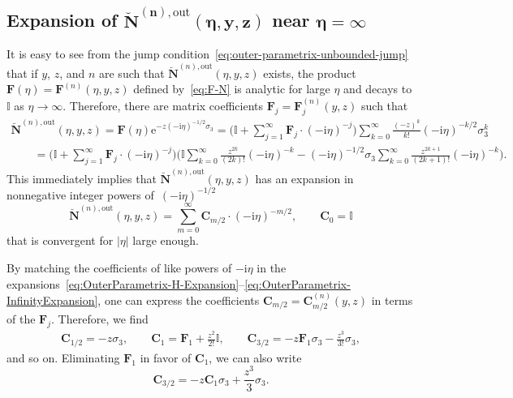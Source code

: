 \documentclass[11pt]{article}
\numberwithin{equation}{section}
\numberwithin{equation}{section}
\begin{document}
\subsection[Expansion of breve\{N\}\^{}\{(n),out\}(eta,y,z) near eta = infty]{Expansion of $\boldsymbol{\breve{\mathbf{N}}^{(n),\mathrm{out}}(\eta,y,z)}$ near $\boldsymbol{\eta=\infty}$}

It is easy to see from the jump condition~\eqref{eq:outer-parametrix-unbounded-jump} that if $y$, $z$, and $n$ are such that $\breve{\mathbf{N}}^{(n),\mathrm{out}}(\eta,y,z)$ exists, the product $\mathbf{F}(\eta)=\mathbf{F}^{(n)}(\eta,y,z)$ defined by~\eqref{eq:F-N} is analytic for large $\eta$ and decays to $\mathbb{I}$ as $\eta\to\infty$. Therefore, there are matrix coefficients $\mathbf{F}_j=\mathbf{F}_j^{(n)}(y,z)$ such that
\begin{gather}
\breve{\mathbf{N}}^{(n),\mathrm{out}}(\eta,y,z)=\mathbf{F}(\eta)\mathrm{e}^{-z(-\mathrm{i}\eta)^{-1/2}\sigma_3}
 =\Bigg(\!\mathbb{I} + \sum_{j=1}^\infty\mathbf{F}_j\cdot(-\mathrm{i}\eta)^{-j}\!\Bigg)\sum_{k=0}^\infty\frac{(-z)^k}{k!}(-\mathrm{i}\eta)^{-k/2}\sigma_3^k \!\!\!\label{eq:OuterParametrix-H-Expansion}\\
\qquad=\Bigg(\mathbb{I} + \sum_{j=1}^\infty\mathbf{F}_j\cdot(-\mathrm{i}\eta)^{-j}\Bigg)\Bigg(\mathbb{I}\sum_{k=0}^\infty\frac{z^{2k}}{(2k)!}(-\mathrm{i}\eta)^{-k} - (-\mathrm{i}\eta)^{-1/2}\sigma_3\sum_{k=0}^\infty\frac{z^{2k+1}}{(2k+1)!}(-\mathrm{i}\eta)^{-k}\Bigg). \nonumber
\end{gather}
This immediately implies that $\breve{\mathbf{N}}^{(n),\mathrm{out}}(\eta,y,z)$ has an expansion in nonnegative integer powers of~$(-\mathrm{i}\eta)^{-1/2}$
\begin{equation}
\breve{\mathbf{N}}^{(n),\mathrm{out}}(\eta,y,z)=\sum_{m=0}^\infty \mathbf{C}_{m/2}\cdot (-\mathrm{i}\eta)^{-m/2},\qquad \mathbf{C}_0=\mathbb{I}
\label{eq:OuterParametrix-InfinityExpansion}
\end{equation}
that is convergent for $|\eta|$ large enough.

By matching the coefficients of like powers of $-\mathrm{i}\eta$ in the expansions~\eqref{eq:OuterParametrix-H-Expansion}--\eqref{eq:OuterParametrix-InfinityExpansion}, one can express the coefficients $\mathbf{C}_{m/2}=\mathbf{C}_{m/2}^{(n)}(y,z)$ in terms of the $\mathbf{F}_j$. Therefore, we find
\begin{gather}
 \mathbf{C}_{1/2} =-z\sigma_3,\qquad
 \mathbf{C}_1 = \mathbf{F}_1 + \frac{z^2}{2!}\mathbb{I},\qquad
 \mathbf{C}_{3/2} = -z\mathbf{F}_1\sigma_3 -\frac{z^3}{3!}\sigma_3,\label{eq:Cs-first}
\end{gather}
and so on. Eliminating $\mathbf{F}_1$ in favor of $\mathbf{C}_1$, we can also write
\begin{equation}
\mathbf{C}_{3/2}=-z\mathbf{C}_1\sigma_3 +\frac{z^3}{3}\sigma_3.
\label{eq:C3/2-C1}
\end{equation}
\end{document}

